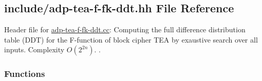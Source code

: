 \hypertarget{adp-tea-f-fk-ddt_8hh}{\subsection{include/adp-\/tea-\/f-\/fk-\/ddt.hh \-File \-Reference}
\label{adp-tea-f-fk-ddt_8hh}
}


\-Header file for \hyperlink{adp-tea-f-fk-ddt_8cc}{adp-\/tea-\/f-\/fk-\/ddt.\-cc}\-: \-Computing the full difference distribution table (\-D\-D\-T) for the \-F-\/function of block cipher \-T\-E\-A by exaustive search over all inputs. \-Complexity $O(2^{2n})$. .  


\subsubsection*{\-Functions}
